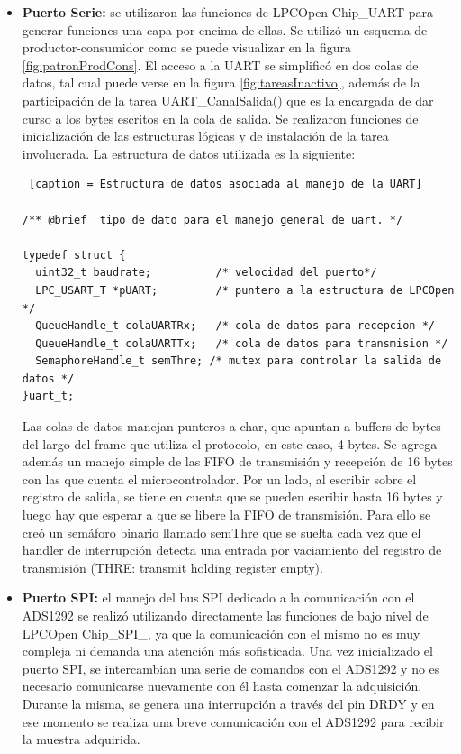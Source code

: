 \begin{itemize}

	\item \textbf{Puerto Serie:} se utilizaron las funciones de LPCOpen Chip\_UART para generar funciones una capa por encima de ellas. Se utilizó un esquema de productor-consumidor como se puede visualizar en la figura \ref{fig:patronProdCons}. El acceso a la UART se simplificó en dos colas de datos, tal cual puede verse en la figura \ref{fig:tareasInactivo}, además de la participación de la tarea UART\_CanalSalida() que es la encargada de dar curso a los bytes escritos en la cola de salida. Se realizaron funciones de inicialización de las estructuras lógicas y de instalación de la tarea involucrada. La estructura de datos utilizada es la siguiente:


\footnotesize 	
\begin{lstlisting} [caption = Estructura de datos asociada al manejo de la UART]

/** @brief  tipo de dato para el manejo general de uart. */

typedef struct {
  uint32_t baudrate;	      /* velocidad del puerto*/
  LPC_USART_T *pUART;		  /* puntero a la estructura de LPCOpen */
  QueueHandle_t colaUARTRx;	  /* cola de datos para recepcion */
  QueueHandle_t colaUARTTx;	  /* cola de datos para transmision */
  SemaphoreHandle_t semThre; /* mutex para controlar la salida de datos */
}uart_t;

\end{lstlisting}	
\normalsize


Las colas de datos manejan punteros a char, que apuntan a buffers de bytes del largo del frame que utiliza el protocolo, en este caso, 4 bytes.
Se agrega además un manejo simple de las FIFO de transmisión y recepción de 16 bytes con las que cuenta el microcontrolador. Por un lado, al escribir sobre el registro de salida, se tiene en cuenta que se pueden escribir hasta 16 bytes y luego hay que esperar a que se libere la FIFO de transmisión. Para ello se creó un semáforo binario llamado semThre que se suelta cada vez que el handler de interrupción detecta una entrada por vaciamiento del registro de transmisión (THRE: transmit holding register empty). 

	\item \textbf{Puerto SPI:} el manejo del bus SPI dedicado a la comunicación con el ADS1292 se realizó utilizando directamente las funciones de bajo nivel de LPCOpen Chip\_SPI\_, ya que la comunicación con el mismo no es muy compleja ni demanda una atención más sofisticada. Una vez inicializado el puerto SPI, se intercambian una serie de comandos con el ADS1292 y no es necesario comunicarse nuevamente con él hasta comenzar la adquisición. Durante la misma, se genera una interrupción a través del pin DRDY y en ese momento se realiza una breve comunicación con el ADS1292 para recibir la muestra adquirida. 
	

\end{itemize}
